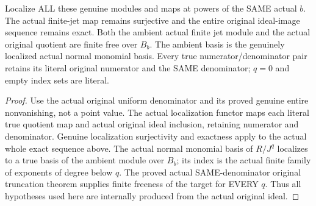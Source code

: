 \begin{theorem}
\label{hir:relative-normal-finite-jet-same-denominator}
\leanok
{}
Localize ALL these genuine modules and maps at powers of the SAME actual
$b$. The actual finite-jet map remains surjective and the entire original
ideal-image sequence remains exact. Both the ambient actual finite jet
module and the actual original quotient are finite free over $B_b$.
The ambient basis is the genuinely localized actual normal monomial basis.
Every true numerator/denominator pair retains its literal original numerator
and the SAME denominator; $q=0$ and empty index sets are literal.
\end{theorem}
\begin{proof}
Use the actual original uniform denominator and its proved genuine entire
nonvanishing, not a point value. The actual localization functor maps each
literal true quotient map and actual original ideal inclusion, retaining
numerator and denominator. Genuine localization surjectivity and exactness
apply to the actual whole exact sequence above. The actual normal monomial
basis of $R/J^q$ localizes to a true basis of the ambient module over $B_b$;
its index is the actual finite family of exponents of degree below $q$.
The proved actual SAME-denominator original truncation theorem supplies
finite freeness of the target for EVERY $q$. Thus all hypotheses used here
are internally produced from the actual original ideal.
\end{proof}

